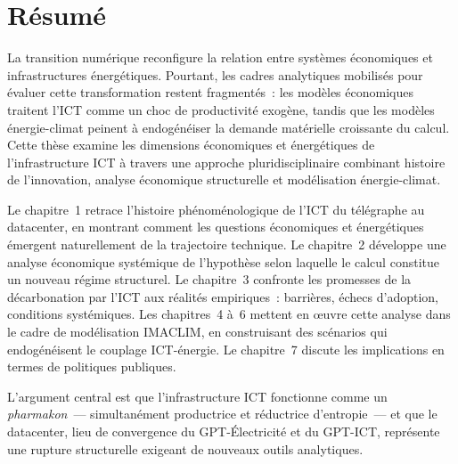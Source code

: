 
\chapter*{Résumé}

La transition numérique reconfigure la relation entre systèmes économiques et infrastructures énergétiques. Pourtant, les cadres analytiques mobilisés pour évaluer cette transformation restent fragmentés~: les modèles économiques traitent l'ICT comme un choc de productivité exogène, tandis que les modèles énergie-climat peinent à endogénéiser la demande matérielle croissante du calcul. Cette thèse examine les dimensions économiques et énergétiques de l'infrastructure ICT à travers une approche pluridisciplinaire combinant histoire de l'innovation, analyse économique structurelle et modélisation énergie-climat.

Le chapitre~1 retrace l'histoire phénoménologique de l'ICT du télégraphe au datacenter, en montrant comment les questions économiques et énergétiques émergent naturellement de la trajectoire technique. Le chapitre~2 développe une analyse économique systémique de l'hypothèse selon laquelle le calcul constitue un nouveau régime structurel. Le chapitre~3 confronte les promesses de la décarbonation par l'ICT aux réalités empiriques~: barrières, échecs d'adoption, conditions systémiques. Les chapitres~4 à~6 mettent en \oe uvre cette analyse dans le cadre de modélisation IMACLIM, en construisant des scénarios qui endogénéisent le couplage ICT-énergie. Le chapitre~7 discute les implications en termes de politiques publiques.

L'argument central est que l'infrastructure ICT fonctionne comme un \emph{pharmakon}~--- simultanément productrice et réductrice d'entropie~--- et que le datacenter, lieu de convergence du GPT-Électricité et du GPT-ICT, représente une rupture structurelle exigeant de nouveaux outils analytiques.
